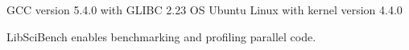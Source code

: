 \documentclass[../document.tex]{subfiles}
\begin{document}
\label{ssec:software}

GCC version 5.4.0 with GLIBC 2.23
OS Ubuntu Linux with kernel version 4.4.0

LibSciBench enables benchmarking and profiling parallel code.

\end{document}
